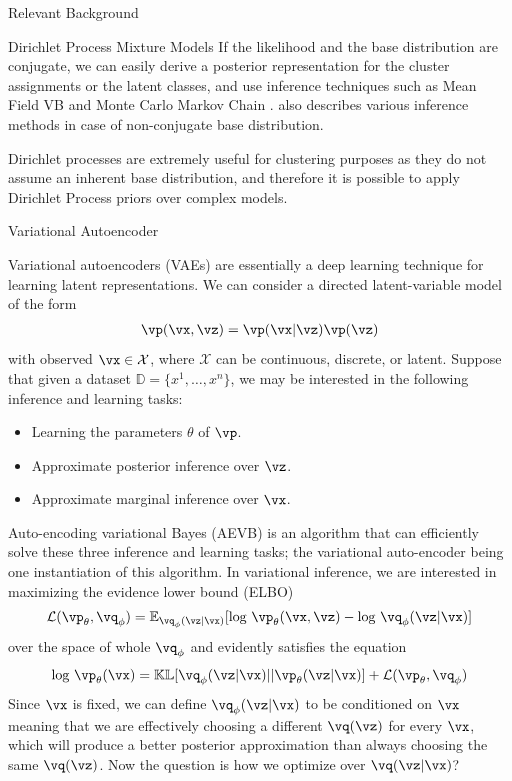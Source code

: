 \documentclass{article}
\begin{document}
\begin{psection}{Relevant Background}
\begin{psubsection}{Dirichlet Process Mixture Models}
	If the likelihood and the base distribution are conjugate, we can easily derive a posterior representation for the cluster assignments or the latent classes, and use inference techniques such as Mean Field VB \citep{blei} and Monte Carlo Markov Chain \citep{esc-west, neal}.	 also describes various inference methods in case of non-conjugate base distribution.

	Dirichlet processes are extremely useful for clustering purposes as they do not assume an inherent base distribution, and therefore it is possible to apply Dirichlet Process priors over complex models.

\end{psubsection}

\begin{psubsection}{Variational Autoencoder}

    Variational autoencoders (VAEs) are essentially a deep learning technique for learning latent representations. We can consider a directed latent-variable model of the form
    \begin{align*}
        \vp(\vx,\vz)=\vp(\vx|\vz)\vp(\vz)
    \end{align*}
    with observed $\vx \in \mathcal{X}$, where $\mathcal{X}$ can be continuous, discrete, or latent. Suppose that given a dataset $\mathbb{D}= \{x^1,\ldots,x^n\}$, we may be interested in the following inference and learning tasks: 
    \begin{itemize}
        \item Learning the parameters $\theta$ of $\vp$.
        \item Approximate posterior inference over $\vz$.
        \item Approximate marginal inference over $\vx$.
    \end{itemize}
    
    Auto-encoding variational Bayes (AEVB) is an algorithm that can efficiently solve these three inference and learning tasks; the variational auto-encoder being one instantiation of this algorithm. In variational inference, we are interested in maximizing the evidence lower bound (ELBO)
    \begin{align*}
        \mathcal{L}(\vp_\theta,\vq_\phi)=\mathbb{E}_{\vq_\phi(\vz|\vx)}[\text{log } \vp_\theta(\vx,\vz)-\text{log } \vq_\phi(\vz|\vx)]
    \end{align*}
    over the space of whole $\vq_\phi$ and evidently satisfies the equation
    \begin{align*}
        \text{log } \vp_\theta(\vx)= \mathbb{KL}[\vq_\phi(\vz|\vx)||\vp_\theta(\vz|\vx)]+\mathcal{L}(\vp_\theta,\vq_\phi)
    \end{align*}
    Since $\vx$ is fixed, we can define $\vq_\phi(\vz|\vx)$ to be conditioned on $\vx$ meaning that we are effectively choosing a different $\vq(\vz)$ for every $\vx$, which will produce a better posterior approximation than always choosing the same $\vq(\vz)$. Now the question is how we optimize over $\vq(\vz|\vx)$?
    

\end{psubsection}
\end{psection}
\end{document}

